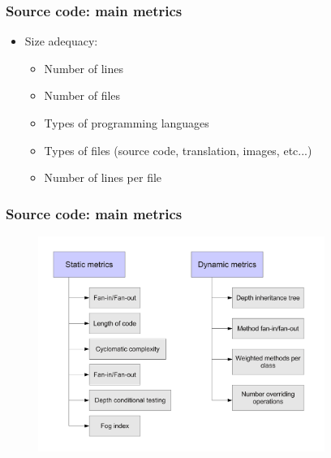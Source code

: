 \documentclass{beamer}
\begin{document}
\begin{frame}
 \frametitle{Source code: main metrics}
 \begin{itemize}
 \item Size adequacy:
  \begin{itemize}
   \item Number of lines
   \item Number of files
   \item Types of programming languages
   \item Types of files (source code, translation, images, etc...)
   \item Number of lines per file
  \end{itemize}
 \end{itemize}
\end{frame}





\begin{frame}
\frametitle{Source code: main metrics}
\begin{center}
\begin{figure}
 \includegraphics[height=7cm]{figs/quality-product-metrics.pdf}
\end{figure}
\end{center}
\end{frame}

\end{document}
